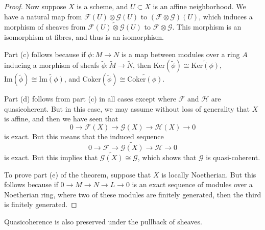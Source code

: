 \begin{proof}
    Now suppose $X$ is a scheme, and $U \subset X$ is an affine neighborhood. We have a natural map from $\mathcal{F}(U) \otimes \mathcal{G}(U)$ to $(\mathcal{F} \otimes \mathcal{G})(U)$, which induces a morphism of sheaves from $\widetilde{\mathcal{F}(U) \otimes \mathcal{G}(U)}$ to $\mathcal{F} \otimes \mathcal{G}$. This morphism is an isomorphism at fibres, and thus is an isomorphism.

    Part (c) follows because if $\phi: M \to N$ is a map between modules over a ring $A$ inducing a morphism of sheafs $\widetilde{\phi}: \widetilde{M} \to \widetilde{N}$, then $\text{Ker}(\widetilde{\phi}) \cong \widetilde{\text{Ker}(\phi)}$, $\text{Im}(\widetilde{\phi}) \cong \widetilde{\text{Im}(\phi)}$, and $\text{Coker}(\widetilde{\phi}) \cong \widetilde{\text{Coker}(\phi)}$.

    Part (d) follows from part (c) in all cases except where $\mathcal{F}$ and $\mathcal{H}$ are quasicoherent. But in this case, we may assume without loss of generality that $X$ is affine, and then we have seen that
    \[ 0 \to \mathcal{F}(X) \to \mathcal{G}(X) \to \mathcal{H}(X) \to 0 \]
    is exact. But this means that the induced sequence
    \[ 0 \to \mathcal{F} \to \widetilde{\mathcal{G}(X)} \to \mathcal{H} \to 0 \]
    is exact. But this implies that $\widetilde{\mathcal{G}(X)} \cong \mathcal{G}$, which shows that $\mathcal{G}$ is quasi-coherent.

    To prove part (e) of the theorem, suppose that $X$ is locally Noetherian. But this follows because if $0 \to M \to N \to L \to 0$ is an exact sequence of modules over a Noetherian ring, where two of these modules are finitely generated, then the third is finitely generated.
\end{proof}

Quasicoherence is also preserved under the pullback of sheaves.

